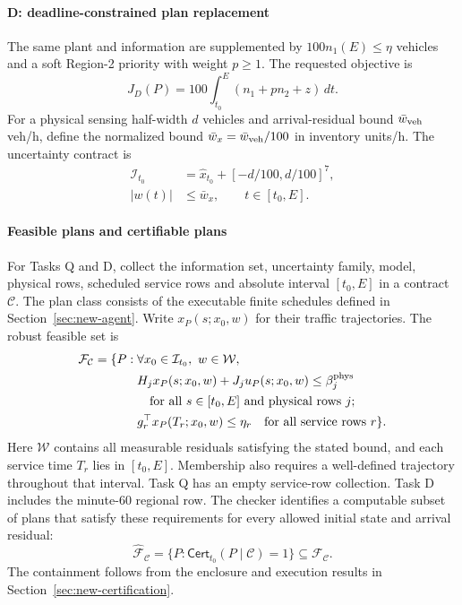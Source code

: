 \documentclass[preprint,12pt]{elsarticle}
\begin{document}
\paragraph{D: deadline-constrained plan replacement}
The same plant and information are supplemented by
$100n_1(E)\le\eta$ vehicles and a soft Region-2 priority with weight
$p\ge1$. The requested objective is
\begin{equation}
J_D(P)=100\int_{t_0}^{E}(n_1+p n_2+z)\,dt.
\label{eq:benchmark-priority-cost}
\end{equation}
For a physical sensing half-width $d$ vehicles and arrival-residual bound
$\bar w_{\rm veh}$ veh/h, define the normalized bound
$\bar w_x=\bar w_{\rm veh}/100$ in inventory units/h. The uncertainty
contract is
\begin{equation}
\begin{aligned}
\mathcal I_{t_0}&=\widehat x_{t_0}+[-d/100,d/100]^7,\\
|w(t)|&\le\bar w_x,\qquad t\in[t_0,E].
\end{aligned}
\label{eq:benchmark-contract}
\end{equation}
\paragraph{Feasible plans and certifiable plans}
For Tasks Q and D, collect the information set, uncertainty family, model,
physical rows, scheduled service rows and absolute interval $[t_0,E]$ in a
contract $\mathcal C$. The plan class consists of the executable finite
schedules defined in Section~\ref{sec:new-agent}. Write
$x_P(s;x_0,w)$ for their traffic trajectories. The robust feasible set is
\begin{equation}
\begin{aligned}
\mathcal F_{\mathcal C}=\{P:\;&\forall x_0\in\mathcal I_{t_0},\ w\in\mathcal W,\\
&H_jx_P(s;x_0,w)+J_ju_P(s;x_0,w)
                         \le\beta_j^{\rm phys}\\
&\hspace{1em}\text{for all }s\in[t_0,E]\text{ and physical rows }j;\\
&g_r^\top x_P(T_r;x_0,w)\le\eta_r
\quad\text{for all service rows }r\}.
\end{aligned}
\label{eq:benchmark-feasible-set}
\end{equation}
Here $\mathcal W$ contains all measurable residuals satisfying the stated
bound, and each service time $T_r$ lies in $[t_0,E]$. Membership also
requires a well-defined trajectory throughout that interval. Task Q has
an empty service-row collection. Task D includes the minute-60 regional
row. The checker identifies a computable subset of plans that satisfy these
requirements for every allowed initial state and arrival residual:
\begin{equation}
\widehat{\mathcal F}_{\mathcal C}
=\{P:\mathsf{Cert}_{t_0}(P\mid\mathcal C)=1\}
\subseteq\mathcal F_{\mathcal C}.
\label{eq:benchmark-certifiable-set}
\end{equation}
The containment follows from the enclosure and execution results in
Section~\ref{sec:new-certification}.
\end{document}
